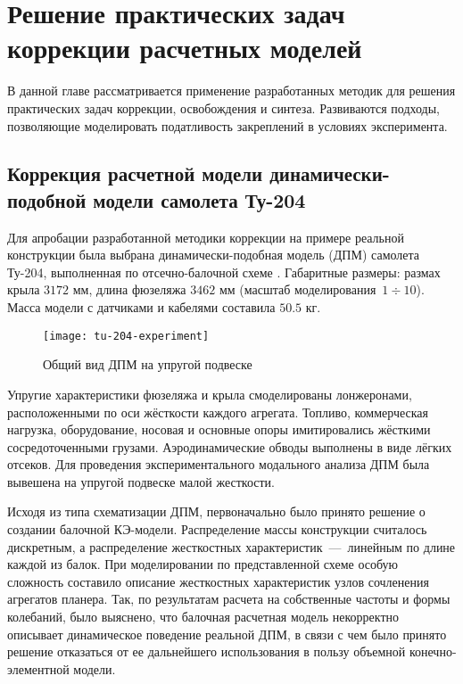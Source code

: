 \chapter{Решение практических задач коррекции расчетных моделей} 

В данной главе рассматривается применение разработанных методик для решения практических задач коррекции, освобождения и синтеза. Развиваются подходы, позволяющие моделировать податливость закреплений в условиях эксперимента. 

\section{Коррекция расчетной модели динамически-подобной модели самолета \mbox{Ту-204}}

Для апробации разработанной методики коррекции на примере реальной конструкции была выбрана динамически-подобная модель (ДПМ) самолета \mbox{Ту-204}, выполненная по отсечно-балочной схеме . Габаритные размеры: размах крыла $ 3172 $ мм, длина фюзеляжа $ 3462 $ мм (масштаб моделирования~$ 1 \div 10 $). Масса модели с датчиками и кабелями составила $ 50.5 $ кг.

\begin{figure}[!htb]
	\centerfloat
	\texttt{[image: tu-204-experiment]}
	\caption{Общий вид ДПМ на упругой подвеске} \label{fig:tu-204-experiment}	
\end{figure}

Упругие характеристики фюзеляжа и крыла смоделированы лонжеронами, расположенными по оси жёсткости каждого агрегата. Топливо, коммерческая нагрузка, оборудование, носовая и основные опоры имитировались жёсткими сосредоточенными грузами. Аэродинамические обводы выполнены в виде лёгких отсеков. Для проведения экспериментального модального анализа ДПМ была вывешена на упругой подвеске малой жесткости.

Исходя из типа схематизации ДПМ, первоначально было принято решение о создании балочной КЭ-модели. Распределение массы конструкции считалось дискретным, а распределение жесткостных характеристик~---~линейным по длине каждой из балок. При моделировании по представленной схеме особую сложность составило описание жесткостных характеристик узлов сочленения агрегатов планера. Так, по результатам расчета на собственные частоты и формы колебаний, было выяснено, что балочная расчетная модель некорректно описывает динамическое поведение реальной ДПМ, в связи с чем было принято решение отказаться от ее дальнейшего использования в пользу объемной конечно-элементной модели.

